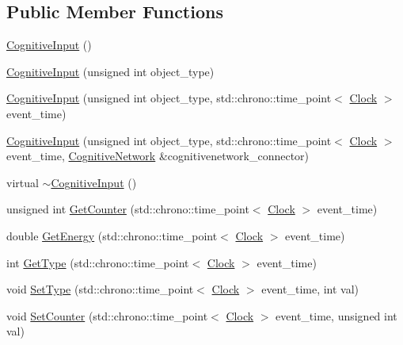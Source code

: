 \subsection*{Public Member Functions}
\begin{DoxyCompactItemize}
\item 
\hyperlink{class_cognitive_input_a5c3c102dc3ec6cfec25eb849488e9782}{Cognitive\+Input} ()
\item 
\hyperlink{class_cognitive_input_a220c07f5be517afe47b4d3c486c4152e}{Cognitive\+Input} (unsigned int object\+\_\+type)
\item 
\hyperlink{class_cognitive_input_a31cc06426ab41c39ec8c795ab29d43de}{Cognitive\+Input} (unsigned int object\+\_\+type, std\+::chrono\+::time\+\_\+point$<$ \hyperlink{universe_8h_a0ef8d951d1ca5ab3cfaf7ab4c7a6fd80}{Clock} $>$ event\+\_\+time)
\item 
\hyperlink{class_cognitive_input_a230ebb8f019af7e0bff51c13bc10c580}{Cognitive\+Input} (unsigned int object\+\_\+type, std\+::chrono\+::time\+\_\+point$<$ \hyperlink{universe_8h_a0ef8d951d1ca5ab3cfaf7ab4c7a6fd80}{Clock} $>$ event\+\_\+time, \hyperlink{class_cognitive_network}{Cognitive\+Network} \&cognitivenetwork\+\_\+connector)
\item 
virtual \hyperlink{class_cognitive_input_a68007661b8fdd7ef39213a1fb3c06bd7}{$\sim$\+Cognitive\+Input} ()
\item 
unsigned int \hyperlink{class_cognitive_input_a695e7e57b717210b64f9e2c4e26c8044}{Get\+Counter} (std\+::chrono\+::time\+\_\+point$<$ \hyperlink{universe_8h_a0ef8d951d1ca5ab3cfaf7ab4c7a6fd80}{Clock} $>$ event\+\_\+time)
\item 
double \hyperlink{class_cognitive_input_a9bdb43198c1a36b97a6da125331bc927}{Get\+Energy} (std\+::chrono\+::time\+\_\+point$<$ \hyperlink{universe_8h_a0ef8d951d1ca5ab3cfaf7ab4c7a6fd80}{Clock} $>$ event\+\_\+time)
\item 
int \hyperlink{class_cognitive_input_a0ad0919c7280b268493b27892bd7c784}{Get\+Type} (std\+::chrono\+::time\+\_\+point$<$ \hyperlink{universe_8h_a0ef8d951d1ca5ab3cfaf7ab4c7a6fd80}{Clock} $>$ event\+\_\+time)
\item 
void \hyperlink{class_cognitive_input_a37d38512fb190431b4baf8f990c077a9}{Set\+Type} (std\+::chrono\+::time\+\_\+point$<$ \hyperlink{universe_8h_a0ef8d951d1ca5ab3cfaf7ab4c7a6fd80}{Clock} $>$ event\+\_\+time, int val)
\item 
void \hyperlink{class_cognitive_input_a4f09c1f176b5406d95a14d7cb1ab75e6}{Set\+Counter} (std\+::chrono\+::time\+\_\+point$<$ \hyperlink{universe_8h_a0ef8d951d1ca5ab3cfaf7ab4c7a6fd80}{Clock} $>$ event\+\_\+time, unsigned int val)

\end{DoxyCompactItemize}
